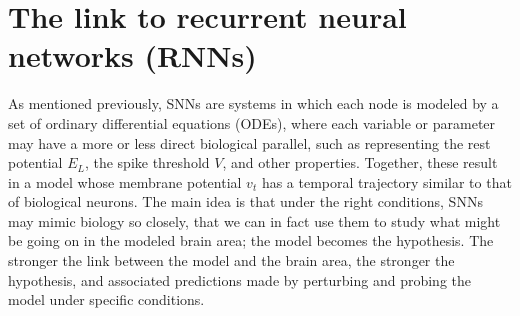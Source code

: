\documentclass[mphil,deptreport,ianc]{infthesis} %
\begin{document}





\section{The link to recurrent neural networks (RNNs)}

As mentioned previously, SNNs are systems in which each node is modeled by a set of ordinary differential equations (ODEs), where each variable or parameter may have a more or less direct biological parallel, such as representing the rest potential $E_L$, the spike threshold $V$, and other properties.
Together, these result in a model whose membrane potential $v_t$ has a temporal trajectory similar to that of biological neurons.
The main idea is that under the right conditions, SNNs may mimic biology so closely, that we can in fact use them to study what might be going on in the modeled brain area; the model becomes the hypothesis.
The stronger the link between the model and the brain area, the stronger the hypothesis, and associated predictions made by perturbing and probing the model under specific conditions.
\end{document}
